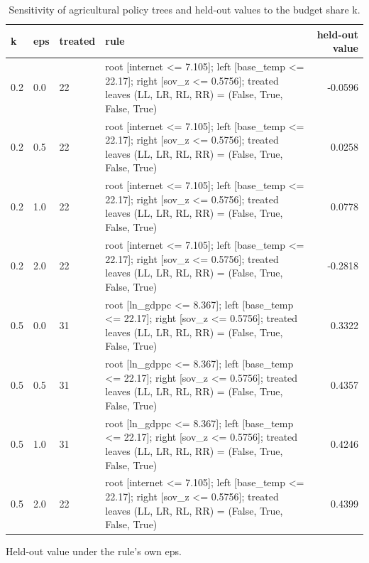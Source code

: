 \begin{table}[htbp]
\centering
\caption{Sensitivity of agricultural policy trees and held-out values to the budget share k.}
\label{tab:agri_budget}
\begin{tabular}{lllp{7cm}r}
\toprule
k & eps & treated & rule & held-out value \\
\midrule
0.2 & 0.0 & 22 & root [internet <= 7.105]; left [base\_temp <= 22.17]; right [sov\_z <= 0.5756]; treated leaves (LL, LR, RL, RR) = (False, True, False, True) & -0.0596 \\
0.2 & 0.5 & 22 & root [internet <= 7.105]; left [base\_temp <= 22.17]; right [sov\_z <= 0.5756]; treated leaves (LL, LR, RL, RR) = (False, True, False, True) & 0.0258 \\
0.2 & 1.0 & 22 & root [internet <= 7.105]; left [base\_temp <= 22.17]; right [sov\_z <= 0.5756]; treated leaves (LL, LR, RL, RR) = (False, True, False, True) & 0.0778 \\
0.2 & 2.0 & 22 & root [internet <= 7.105]; left [base\_temp <= 22.17]; right [sov\_z <= 0.5756]; treated leaves (LL, LR, RL, RR) = (False, True, False, True) & -0.2818 \\
0.5 & 0.0 & 31 & root [ln\_gdppc <= 8.367]; left [base\_temp <= 22.17]; right [sov\_z <= 0.5756]; treated leaves (LL, LR, RL, RR) = (False, True, False, True) & 0.3322 \\
0.5 & 0.5 & 31 & root [ln\_gdppc <= 8.367]; left [base\_temp <= 22.17]; right [sov\_z <= 0.5756]; treated leaves (LL, LR, RL, RR) = (False, True, False, True) & 0.4357 \\
0.5 & 1.0 & 31 & root [ln\_gdppc <= 8.367]; left [base\_temp <= 22.17]; right [sov\_z <= 0.5756]; treated leaves (LL, LR, RL, RR) = (False, True, False, True) & 0.4246 \\
0.5 & 2.0 & 22 & root [internet <= 7.105]; left [base\_temp <= 22.17]; right [sov\_z <= 0.5756]; treated leaves (LL, LR, RL, RR) = (False, True, False, True) & 0.4399 \\
\bottomrule
\end{tabular}
\par\smallskip\footnotesize Held-out value under the rule's own eps.
\end{table}
